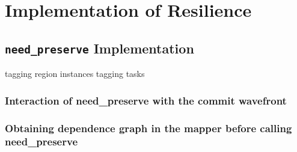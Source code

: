 
\section{Implementation of Resilience}

\subsection{\texttt{need\_preserve} Implementation}

tagging region instances
tagging tasks

\subsubsection{Interaction of need\_preserve with the commit wavefront}
\subsubsection{Obtaining dependence graph in the mapper before calling need\_preserve} 
